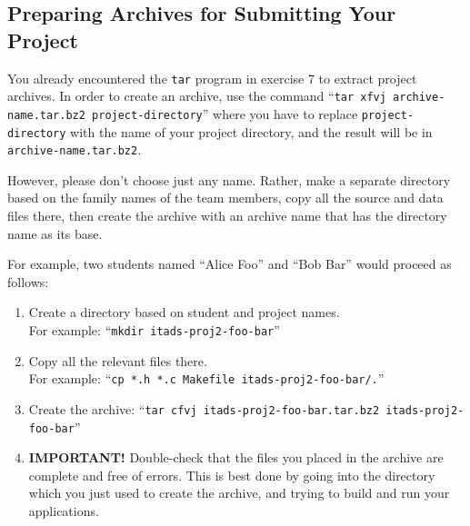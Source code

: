 \documentclass[a4paper,10pt]{article}
\begin{document}
\subsection*{Preparing Archives for Submitting Your Project}

You already encountered the \texttt{tar} program in exercise 7 to extract project archives.
In order to create an archive, use the command ``\texttt{tar xfvj archive-name.tar.bz2 project-directory}'' where you have to replace \texttt{project-directory} with the name of your project directory, and the result will be in \texttt{archive-name.tar.bz2}.

However, please don't choose just any name.
Rather, make a separate directory based on the family names of the team members, copy all the source and data files there, then create the archive with an archive name that has the directory name as its base.

For example, two students named ``Alice Foo'' and ``Bob Bar'' would proceed as follows:
\begin{enumerate}
\item
  Create a directory based on student and project names.\\
  For example: ``\texttt{mkdir itads-proj2-foo-bar}''
\item
  Copy all the relevant files there.\\
  For example: ``\texttt{cp *.h *.c Makefile itads-proj2-foo-bar/.}''
\item
  Create the archive: ``\texttt{tar cfvj itads-proj2-foo-bar.tar.bz2 itads-proj2-foo-bar}''
\item
  \textbf{IMPORTANT!}
  Double-check that the files you placed in the archive are complete and free of errors.
  This is best done by going into the directory which you just used to create the archive, and trying to build and run your applications.
\end{enumerate}



\footnotesize


\end{document}
